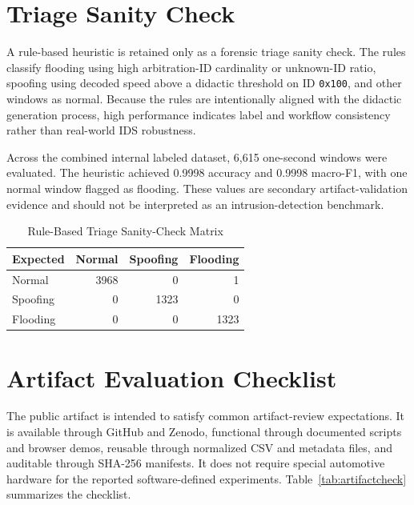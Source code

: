 \documentclass[conference]{IEEEtran}
\begin{document}
\section{Triage Sanity Check}
A rule-based heuristic is retained only as a forensic triage sanity check. The rules classify flooding using high arbitration-ID cardinality or unknown-ID ratio, spoofing using decoded speed above a didactic threshold on ID \texttt{0x100}, and other windows as normal. Because the rules are intentionally aligned with the didactic generation process, high performance indicates label and workflow consistency rather than real-world IDS robustness.

Across the combined internal labeled dataset, 6,615 one-second windows were evaluated. The heuristic achieved 0.9998 accuracy and 0.9998 macro-F1, with one normal window flagged as flooding. These values are secondary artifact-validation evidence and should not be interpreted as an intrusion-detection benchmark.

\begin{table}[t]
\caption{Rule-Based Triage Sanity-Check Matrix}
\label{tab:triage}
\centering
\footnotesize
\begin{tabular}{lrrr}
\toprule
Expected & Normal & Spoofing & Flooding \\
\midrule
Normal & 3968 & 0 & 1 \\
Spoofing & 0 & 1323 & 0 \\
Flooding & 0 & 0 & 1323 \\
\bottomrule
\end{tabular}
\end{table}

\section{Artifact Evaluation Checklist}
The public artifact is intended to satisfy common artifact-review expectations. It is available through GitHub and Zenodo, functional through documented scripts and browser demos, reusable through normalized CSV and metadata files, and auditable through SHA-256 manifests. It does not require special automotive hardware for the reported software-defined experiments. Table~\ref{tab:artifactcheck} summarizes the checklist.
\end{document}
